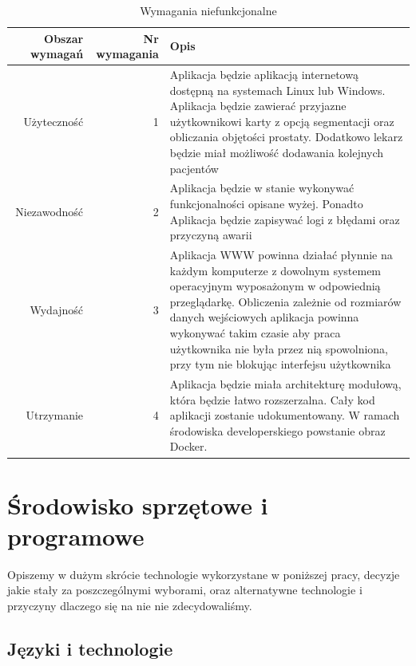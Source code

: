 \documentclass[a4paper,11pt,twoside]{report}
\theoremstyle{definition}
\begin{document}
\begin{table}[h!]
\caption{Wymagania niefunkcjonalne}
\centering
\begin{tabular}{|r|r|p{10cm}|} \hline 
	Obszar wymagań & Nr wymagania & Opis \\ \hline 
	Użyteczność & 1 & Aplikacja będzie aplikacją internetową dostępną na systemach Linux lub Windows. Aplikacja będzie zawierać przyjazne użytkownikowi karty z opcją segmentacji oraz obliczania objętości prostaty. Dodatkowo lekarz będzie miał możliwość dodawania kolejnych pacjentów \\ \hline 
	Niezawodność & 2 & Aplikacja będzie w stanie wykonywać funkcjonalności opisane wyżej. Ponadto Aplikacja będzie zapisywać logi z błędami oraz przyczyną awarii \\ \hline 
	Wydajność & 3 & Aplikacja WWW powinna działać płynnie na każdym
komputerze z dowolnym systemem operacyjnym wyposażonym
w odpowiednią przeglądarkę. Obliczenia zależnie od rozmiarów danych wejściowych aplikacja powinna wykonywać takim czasie aby praca użytkownika nie była przez nią spowolniona, przy tym nie blokując interfejsu użytkownika \\ \hline 
	Utrzymanie & 4 & Aplikacja będzie miała architekturę modułową, która będzie łatwo rozszerzalna. Cały kod aplikacji zostanie udokumentowany. W ramach środowiska developerskiego powstanie obraz Docker.  \\ \hline 
\end{tabular}
\label{Wymagania niefunkcjonalne}
\end{table}

\section{Środowisko sprzętowe i programowe}

Opiszemy w dużym skrócie technologie wykorzystane w poniższej pracy, decyzje jakie stały za poszczególnymi wyborami, oraz alternatywne technologie i przyczyny dlaczego się na nie nie zdecydowaliśmy. 

\subsection{Języki i technologie }
\end{document}

